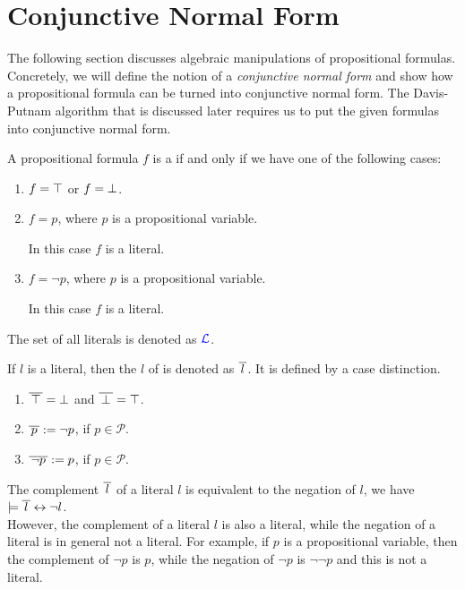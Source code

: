\section{Conjunctive Normal Form}
The following section discusses algebraic manipulations of propositional formulas.  Concretely, we will define
the notion of a \emph{conjunctive normal form} and show how a propositional formula can be turned into
conjunctive normal form.  The Davis-Putnam algorithm that is discussed later requires us to put the given
formulas into conjunctive normal form.

\begin{Definition}[Literal]
  A propositional formula $f$ is a  if and only if we have one of the following cases: 
  \begin{enumerate}
  \item $f = \top$ or $f = \bot$.
  \item $f = p$, where $p$ is a propositional variable.

        In this case $f$ is a  literal.
  \item $f = \neg p$, where $p$ is a propositional variable. 

        In this case $f$ is a  literal.
  \end{enumerate}
  The set of all literals is denoted as  ${\color{blue}\mathcal{L}}$.  \eox
\end{Definition}

If  $l$ is a literal, then the  $l$ of is denoted as $\overline{\,l\,}$.
It is defined by a case distinction.
\begin{enumerate}
\item $\overline{\,\top\,} = \bot$ \quad and \quad $\overline{\,\bot\,} = \top$. 
\item $\overline{\,p\,} := \neg p$, \quad if $p \in \mathcal{P}$.
\item $\overline{\,\neg p\,} := p$, \quad if $p \in \mathcal{P}$.
\end{enumerate}
The complement $\overline{\,l\,}$ of a literal $l$ is equivalent to the negation of $l$, we have
\\[0.2cm]
\hspace*{1.3cm}
$\models \overline{\,l\,} \leftrightarrow \neg l$.
\\[0.2cm]
However, the complement of a literal $l$ is also a literal, while the negation of a literal is in general not a
literal. For example, if $p$ is a propositional variable, then the complement of $\neg p$ is $p$, while the
negation of $\neg p$ is $\neg \neg p$ and this is not a literal.

